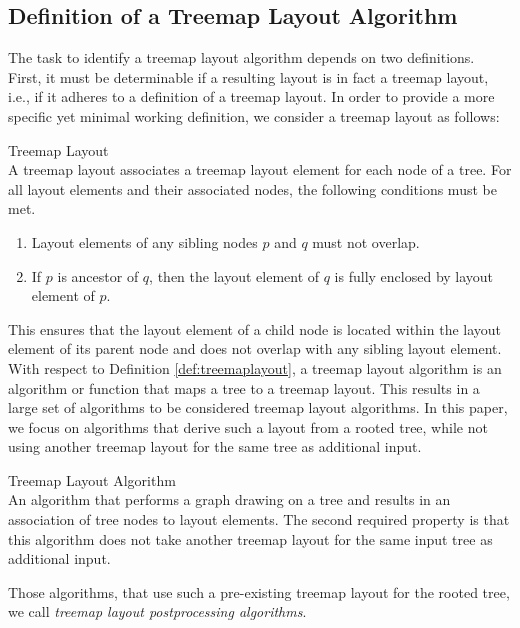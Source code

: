 \documentclass[sigconf%
,natbib=true%
]{acmart}
\begin{document}
\subsection{Definition of a Treemap Layout Algorithm}
The task to identify a treemap layout algorithm depends on two definitions. 
First, it must be determinable if a resulting layout is in fact a treemap layout, i.e., if it adheres to a definition of a treemap layout.
In order to provide a more specific yet minimal working definition, we consider a treemap layout as follows:
\begin{definition}{Treemap Layout} \\%
	\label{def:treemaplayout}%
	A treemap layout associates a treemap layout element for each node of a tree.
	For all layout elements and their associated nodes, the following conditions must be met.
	\begin{enumerate}
		\item[(i)] Layout elements of any sibling nodes $p$ and $q$ must not overlap.
		\item[(ii)] If $p$ is ancestor of $q$, then the layout element of $q$ is fully enclosed by layout element of $p$.
	\end{enumerate}
\end{definition}
This ensures that the layout element of a child node is located within the layout element of its parent node and does not overlap with any sibling layout element.
With respect to Definition \ref{def:treemaplayout}, a treemap layout algorithm is an algorithm or function that maps a tree to a treemap layout.
This results in a large set of algorithms to be considered treemap layout algorithms.
In this paper, we focus on algorithms that derive such a layout from a rooted tree, while not using another treemap layout for the same tree as additional input.
\begin{definition}{Treemap Layout Algorithm} \\%
	\label{def:treemaplayoutalgorithm}%
	An algorithm that performs a graph drawing on a tree and results in an association of tree nodes to layout elements.
	The second required property is that this algorithm does not take another treemap layout for the same input tree as additional input.
\end{definition}
Those algorithms, that use such a pre-existing treemap layout for the rooted tree, we call \emph{treemap layout postprocessing algorithms}.
\end{document}
